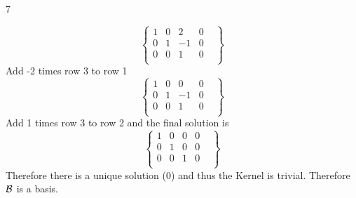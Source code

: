 \documentclass{exercises}
\begin{document}
\begin{exr}{}{7}
\begin{enumerate}
\begin{equation}
\left\{
    \begin{array}{ccc|cl}1&0&2&0&\\0&1&-1&0&\\0&0&1&0&\\\end{array}
\right\}
\end{equation}Add -2 times row 3 to row 1
\begin{equation}
\left\{
    \begin{array}{ccc|cl}1&0&0&0&\\0&1&-1&0&\\0&0&1&0&\\\end{array}
\right\}
\end{equation}Add 1 times row 3 to row 2
and the final solution is
\begin{equation}
\left\{
    \begin{array}{ccc|cl}1&0&0&0&\\0&1&0&0&\\0&0&1&0&\\\end{array}
\right\}
\end{equation}
Therefore there is a unique solution ($0$) and thus the Kernel is trivial. Therefore $\scriptb$ is a basis. \\


\end{enumerate}
\end{exr}
\end{document}
